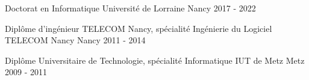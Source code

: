 
\begin{cventries}

\cventry
  {Doctorat en Informatique} %
  {Université de Lorraine} %
  {Nancy} %
  {2017 - 2022} %
  {}

\vspace{-1em}


\cventry
    {Diplôme d'ingénieur TELECOM Nancy, spécialité Ingénierie du Logiciel} %
    {TELECOM Nancy} %
    {Nancy} %
    {2011 - 2014} %
    {}

\vspace{-1em}

\cventry
  {Diplôme Universitaire de Technologie, spécialité Informatique} %
  {IUT de Metz} %
  {Metz} %
  {2009 - 2011} %
  {}
\end{cventries}
